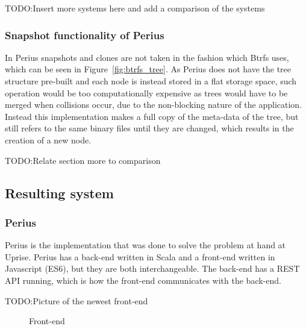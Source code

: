 \documentclass[a4paper,12pt]{article}
\newcommand{\fix}{\colorbox{yellow!30}{TODO:}}
\begin{document}
\fix Insert more systems here and add a comparison of the systems

\subsubsection{Snapshot functionality of Perius}
In Perius snapshots and clones are not taken in the fashion which Btrfs uses, which can be seen in
Figure~\ref{fig:btrfs_tree}. As Perius does not have the tree structure pre-built and each node is
instead stored in a flat storage space, such operation would be too computationally expensive as
trees would have to be merged when collisions occur, due to the non-blocking nature of the
application. Instead this implementation makes a full copy of the meta-data of the tree, but still
refers to the same binary files until they are changed, which results in the creation of a new node.

\fix Relate section more to comparison

\subsection{Resulting system}
\subsubsection{Perius}
Perius is the implementation that was done to solve the problem at hand at Uprise. Perius has a
back-end written in Scala and a front-end written in Javascript (ES6), but they are both
interchangeable. The back-end has a REST API running, which is how the front-end communicates with
the back-end.

\fix Picture of the newest front-end
\begin{figure}[H] 
    \caption{Front-end~\cite{BTRFS}}
    \label{fig:frontend}
\end{figure}
\end{document}
